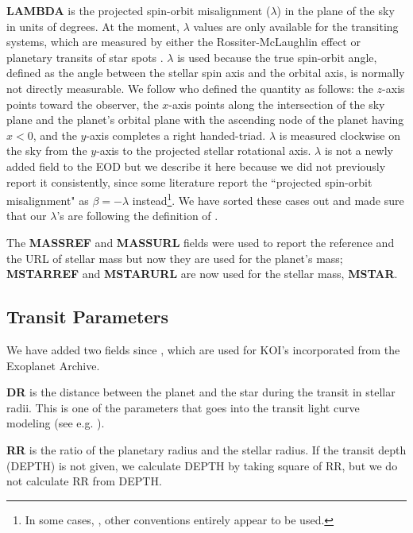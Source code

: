 \documentclass[11pt,preprint]{aastex}
\begin{document}
\begin{CJK*}{UTF8}{gbsn}
{\bf LAMBDA} is the projected spin-orbit misalignment ($\lambda$) in
the plane of the sky in units of degrees. At the moment, $\lambda$
values are only available for the transiting systems, which are
measured by either the Rossiter-McLaughlin effect
\citep[e.g.,][]{Winn2005} or planetary transits of star spots
\citep[e.g.,][]{Sanchis-Ojeda2012}. $\lambda$ is used because the true
spin-orbit angle, defined as the angle between the stellar spin axis
and the orbital axis, is normally not directly measurable. We follow
\cite{Fabrycky2009} who defined the quantity as follows: the $z$-axis
points toward the observer, the $x$-axis points along the intersection
of the sky plane and the planet's orbital plane with the ascending
node of the planet having $x<0$, and the $y$-axis completes a right
handed-triad. $\lambda$ is measured clockwise on the sky from the
$y$-axis to the projected stellar rotational axis. $\lambda$ is not a
newly added field to the EOD but we describe it here because we did
not previously report it consistently, since some literature report
the ``projected spin-orbit misalignment" as $\beta = -\lambda$
instead\footnote{In some cases, \citep[e.g.][]{Moutou2011}, other
  conventions entirely appear to be used.}. We have sorted these cases
out and made sure that our $\lambda$'s are following the definition of
\cite{Fabrycky2009}.

The {\bf MASSREF} and {\bf MASSURL} fields were used to report the
reference and the URL of stellar mass but now they are used for the planet's
mass; {\bf MSTARREF} and {\bf MSTARURL} are now used for the stellar
mass, {\bf MSTAR}.

\subsection{Transit Parameters}\label{sec:transit}

We have added two fields since \cite{Wright2011}, which are used for
KOI's incorporated from the Exoplanet Archive. 

{\bf DR} is the distance between the planet and the star during the
transit in stellar radii. This is one of the parameters that goes into
the transit light curve modeling (see e.g. \citealt{Batalha2013}).

{\bf RR} is the ratio of the planetary radius and the stellar
radius. If the transit depth (DEPTH) is not given, we calculate DEPTH
by taking square of RR, but we do not calculate RR from DEPTH.



\end{CJK*}
\end{document}
